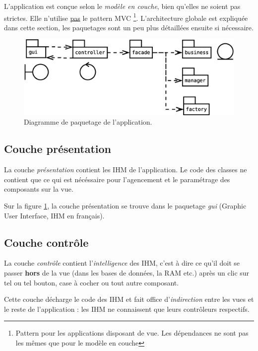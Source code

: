 \label{partie_architecture}
L'application est conçue selon le \textit{modèle en couche}, bien qu'elles ne soient pas strictes.
Elle n'utilise \underline{pas} le pattern MVC
\footnote{\label{MVC_pas_utile}Pattern pour les applications disposant de vue.
  Les dépendances ne sont pas les mêmes que pour le modèle en couche}.
L'architecture globale est expliquée dans cette section, les paquetages sont un peu plus détaillées ensuite si nécessaire.

\begin{figure}[!h]
  \centering
  \includegraphics[width=14cm]{images/paquetage.eps}
  \caption{Diagramme de paquetage de l'application.}
  \label{diagramme_de_paquetage_idb}
\end{figure}

\subsection{Couche présentation}
La couche \textit{présentation} contient les IHM de l'application.
Le code des classes ne contient que ce qui est nécéssaire pour l'agencement et le paramétrage des composants sur la vue.

Sur la figure \ref{diagramme_de_paquetage_idb}, la couche présentation se trouve dans le paquetage \textit{gui} (Graphic User Interface, IHM en français).

\subsection{Couche contrôle}
La couche \textit{contrôle} contient l'\textit{intelligence} des IHM, c'est à dire ce qu'il doit se passer \textbf{hors} de la vue (dans les bases de données, la RAM etc.) après un clic sur tel ou tel bouton, case à cocher ou tout autre composant.

Cette couche décharge le code des IHM et fait office d'\textit{indirection} entre les vues et le reste de l'application : les IHM ne connaissent que leurs contrôleurs respectifs.

